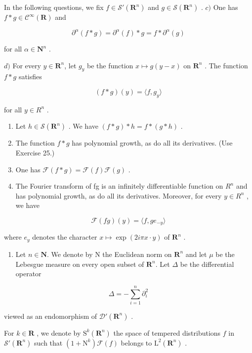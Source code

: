 In the following questions, we fix \(f \in \mathcal{S}'(\mathbf{R}^n)\) and \(g \in \mathcal{S}(\mathbf{R}^n)\) . \(c)\) One has \(f * g \in \mathcal{C}^\infty(\mathbf{R})\) and

\[
\partial^ {\alpha} (f * g) = \partial^ {\alpha} (f) * g = f * \partial^ {\alpha} (g)
\]

for all \(\alpha\in\mathbf{N}^{n}\) .

\(d)\) For every \(y \in \mathbf{R}^n\), let \(g_y\) be the function \(x \mapsto g(y - x)\) on \(\mathbf{R}^n\) . The function \(f * g\) satisfies

\[
(f * g) (y) = \langle f, g _ {y} \rangle
\]

for all \(y \in R^{n}\) .

\begin{enumerate}
\def\labelenumi{\alph{enumi})}
\setcounter{enumi}{4}
\item
  Let \(h \in \mathcal{S}(\mathbf{R}^n)\) . We have \((f*g)*h = f*(g*h)\) .
\item
  The function \(f*g\) has polynomial growth, as do all its derivatives. (Use Exercise 25.)
\item
  One has \(\mathcal{F}(f*g) = \mathcal{F}(f)\mathcal{F}(g)\) .
\item
  The Fourier transform of fg is an infinitely differentiable function on \(R^{n}\) and has polynomial growth, as do all its derivatives. Moreover, for every \(y \in R^{n}\) , we have
\end{enumerate}

\[
\mathcal {F} (f g) (y) = \langle f, g e _ {- y} \rangle
\]

where \(e_y\) denotes the character \(x \mapsto \exp(2i\pi x \cdot y)\) of \(\mathbf{R}^n\) .

\begin{enumerate}
\def\labelenumi{\arabic{enumi})}
\setcounter{enumi}{26}
\tightlist
\item
  Let \(n \in \mathbf{N}\). We denote by N the Euclidean norm on \(\mathbf{R}^{n}\) and let \(\mu\) be the Lebesgue measure on every open subset of \(\mathbf{R}^{n}\). Let \(\Delta\) be the differential operator
\end{enumerate}

\[
\Delta = - \sum_ {i = 1} ^ {n} \partial_ {i} ^ {2}
\]

viewed as an endomorphism of \(\mathcal{D}'(\mathbf{R}^{n})\) .

For \(k \in \mathbf{R}\) , we denote by \(\mathrm{S}^k(\mathbf{R}^n)\) the space of tempered distributions \(f\) in \(\mathcal{S}'(\mathbf{R}^n)\) such that \((1 + \mathrm{N}^k)\mathcal{F}(f)\) belongs to \(\mathrm{L}^2(\mathbf{R}^n)\) .

